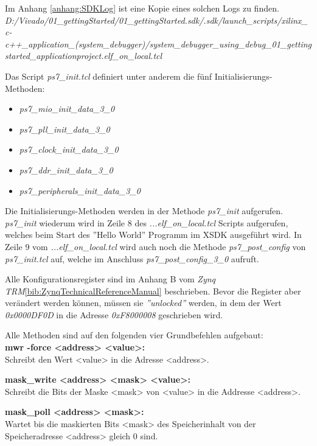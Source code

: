 Im Anhang \ref{anhang:SDKLog} ist eine Kopie eines solchen Logs zu finden.
\textit{D:/Vivado/01\_gettingStarted/01\_gettingStarted.sdk/.sdk/launch\_scripts/xilinx\_c-c++\_application\_(system\_debugger)/system\_debugger\_using\_debug\_01\_gettingstarted\_applicationproject.elf\_on\_local.tcl}

Das Script \textit{ps7\_init.tcl} definiert unter anderem die fünf Initialisierungs-Methoden:
\begin{itemize}
\item \textit{ps7\_mio\_init\_data\_3\_0}
\item \textit{ps7\_pll\_init\_data\_3\_0}
\item \textit{ps7\_clock\_init\_data\_3\_0} 
\item \textit{ps7\_ddr\_init\_data\_3\_0}
\item \textit{ps7\_peripherals\_init\_data\_3\_0}
\end{itemize}
Die Initialisierungs-Methoden werden in der Methode \textit{ps7\_init} aufgerufen.
\textit{ps7\_init} wiederum wird in Zeile 8 des \textit{...elf\_on\_local.tcl} Scripts aufgerufen, welches beim Start des ''Hello World'' Programm im XSDK ausgeführt wird.
In Zeile 9 vom \textit{...elf\_on\_local.tcl} wird auch noch die Methode \textit{ps7\_post\_config} von \textit{ps7\_init.tcl} auf, welche im Anschluss \textit{ps7\_post\_config\_3\_0} aufruft.

Alle Konfigurationsregister sind im Anhang B vom \textit{Zynq TRM}\ref{bib:ZynqTechnicalReferenceManual} beschrieben.
Bevor die Register aber verändert werden können, müssen sie \textit{''unlocked''} werden, in dem der Wert \textit{0x0000DF0D} in die Adresse \textit{0xF8000008} geschrieben wird.

Alle Methoden sind auf den folgenden vier Grundbefehlen aufgebaut:\\
\textbf{mwr -force <address> <value>: }\\
Schreibt den Wert <value> in die Adresse <address>.

\textbf{mask\_write <address> <mask> <value>: }\\
Schreibt die Bits der Maske <mask> von <value> in die Addresse <address>.

\textbf{mask\_poll <address> <mask>:  }\\
Wartet bis die maskierten Bits <mask> des Speicherinhalt von der Speicheradresse <address> gleich 0 sind.

